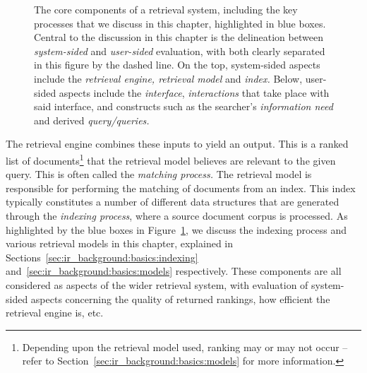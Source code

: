\begin{figure}[t!]
    \centering
    \caption[Basics of an experimental retrieval system]{The core components of a retrieval system, including the key processes that we discuss in this chapter, highlighted in blue boxes. Central to the discussion in this chapter is the delineation between \emph{system-sided} and \emph{user-sided} evaluation, with both clearly separated in this figure by the dashed line. On the top, system-sided aspects include the \emph{retrieval engine, retrieval model} and \emph{index.} Below, user-sided aspects include the \emph{interface}, \emph{interactions} that take place with said interface, and constructs such as the searcher's \emph{information need} and derived \emph{query/queries.}}
    \label{fig:irs}
\end{figure}

The retrieval engine combines these inputs to yield an output. This is a ranked list of documents\footnote{Depending upon the retrieval model used, ranking may or may not occur -- refer to Section~\ref{sec:ir_background:basics:models} for more information.} that the retrieval model believes are relevant to the given query. This is often called the \emph{matching process.} The retrieval model is responsible for performing the matching of documents from an index. This index typically constitutes a number of different data structures that are generated through the \emph{indexing process}, where a source document corpus is processed. As highlighted by the blue boxes in Figure~\ref{fig:irs}, we discuss the indexing process and various retrieval models in this chapter, explained in Sections~\ref{sec:ir_background:basics:indexing} and~\ref{sec:ir_background:basics:models} respectively. These components are all considered as  aspects of the wider retrieval system, with evaluation of system-sided aspects concerning the quality of returned rankings, how efficient the retrieval engine is, etc.

